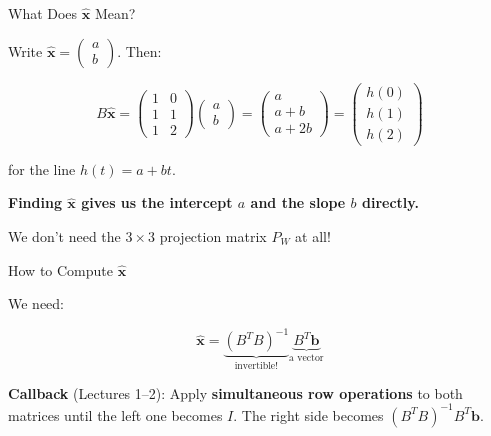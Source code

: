 \documentclass[10pt]{beamer}
\theoremstyle{definition}
\newcommand{\x}[1]{\alert{\textbf{#1}}}
\begin{document}
\begin{frame}{What Does $\hat{\mathbf{x}}$ Mean?}

Write $\hat{\mathbf{x}} = \begin{pmatrix} a \\ b \end{pmatrix}$. Then:

$$B\hat{\mathbf{x}} = \begin{pmatrix} 1 & 0 \\ 1 & 1 \\ 1 & 2 \end{pmatrix}\begin{pmatrix} a \\ b \end{pmatrix} = \begin{pmatrix} a \\ a + b \\ a + 2b \end{pmatrix} = \begin{pmatrix} h(0) \\ h(1) \\ h(2) \end{pmatrix}$$

\vspace{0.5em}

for the line $h(t) = a + bt$.

\vspace{0.5em}

\x{Finding $\hat{\mathbf{x}}$ gives us the intercept $a$ and the slope $b$ directly.}

\vspace{0.3em}

We don't need the $3 \times 3$ projection matrix $P_W$ at all!

\end{frame}


\begin{frame}{How to Compute $\hat{\mathbf{x}}$}

We need:

$$\hat{\mathbf{x}} = \underbrace{(B^TB)^{-1}}_{\text{invertible!}}\underbrace{B^T\mathbf{b}}_{\text{a vector}}$$

\vspace{0.5em}

\x{Callback} (Lectures 1--2): Apply \x{simultaneous row operations} to both matrices until the left one becomes $I$. The right side becomes $(B^TB)^{-1}B^T\mathbf{b}$.

\end{frame}
\end{document}
